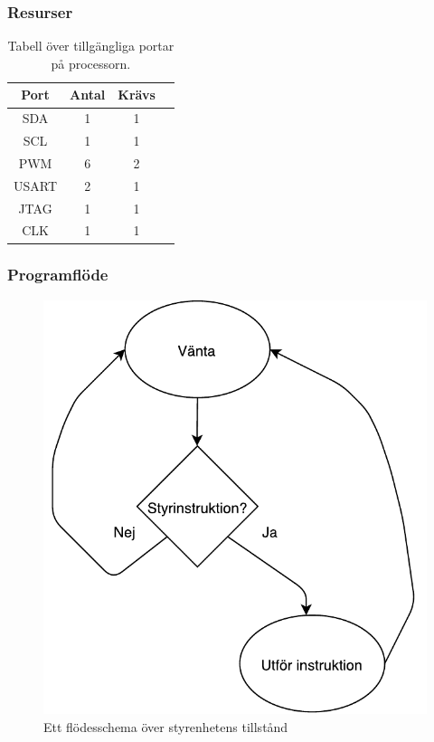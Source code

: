 \documentclass{article}
\begin{document}
\subsubsection{Resurser}
\begin{table}[H]
  \centering
  \begin{tabular}{ | c | c | c | c |}
    \hline
    \textbf{Port} & \textbf{Antal} & \textbf{Krävs} \\
    \hline
    SDA & 1 & 1 \\
    \hline
    SCL & 1 & 1 \\
    \hline
    PWM & 6 & 2 \\
    \hline
    USART & 2 & 1 \\
    \hline
    JTAG & 1 & 1 \\
    \hline
    CLK & 1 & 1 \\
    \hline
  \end{tabular}
  \caption{Tabell över tillgängliga portar på processorn.}
\end{table}

\subsubsection{Programflöde}

\begin{figure}[H]
\centering
\includegraphics[scale=0.6]{styrenhet_flowchart}
\caption{Ett flödesschema över styrenhetens tillstånd}
\label{fig:styrenhet_flowchart}
\end{figure}
\end{document}
